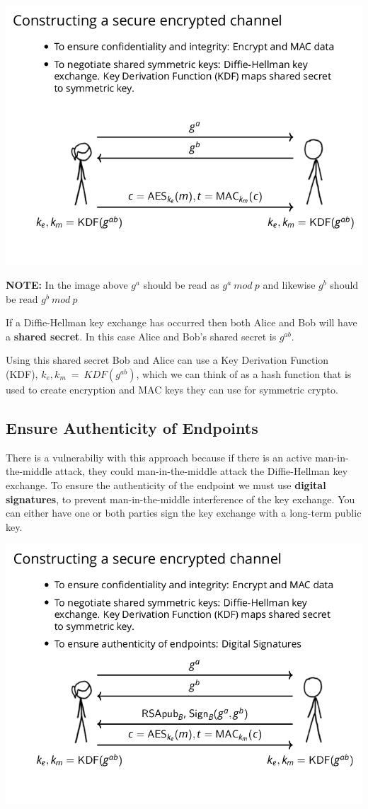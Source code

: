 \documentclass[11pt]{article} %
\begin{document}
\includegraphics[scale=.7]{./tls2.png}

{\parindent0pt \textbf{NOTE:} In the image above $g^{a}$  should be read as 
$g^{a}\ mod\ p$ and likewise $g^{b}$ should be read $g^{b}\ mod\ p$}

\bigskip
{\parindent0pt If a Diffie-Hellman key exchange has occurred then both Alice 
and Bob will have a \textbf{shared secret}. In this case Alice and Bob's shared
secret is $g^{ab}$.}

\bigskip
{\parindent0pt Using this shared secret Bob and Alice can use a Key Derivation
Function (KDF), 
\smallskip
$k_e, k_m\ =\ KDF(g^{ab})$, which we can think of as a hash function that is 
used to create encryption and MAC keys they can use for symmetric crypto.}

\newpage
\subsection{Ensure Authenticity of Endpoints}
There is a vulnerabiliy with this approach because if there is an active
man-in-the-middle attack, they could man-in-the-middle attack the Diffie-Hellman
key exchange.  To ensure the authenticity of the endpoint we must use
\textbf{digital signatures}, to prevent man-in-the-middle interference of the
key exchange.
\smallskip
You can either have one or both parties sign the key exchange with a long-term
public key.

\includegraphics[scale=.7]{./tls3.png}
\end{document}
